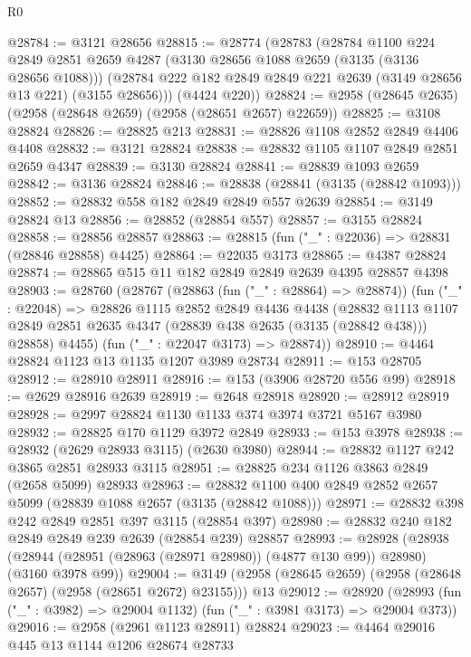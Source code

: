 \begin{lexlean}{R0}
\begin{coremodule}
@28784 := @3121 @28656
@28815 := @28774
    (@28783
      (@28784
        @1100
        @224
        @2849
        @2851
        @2659
        @4287
        (@3130 @28656 @1088 @2659 (@3135 (@3136 @28656 @1088)))
        (@28784 @222 @182 @2849 @2849 @221 @2639 (@3149 @28656 @13 @221) (@3155 @28656)))
      (@4424 @220))
@28824 := @2958 (@28645 @2635) (@2958 (@28648 @2659) (@2958 (@28651 @2657) @22659))
@28825 := @3108 @28824
@28826 := @28825 @213
@28831 := @28826 @1108 @2852 @2849 @4406 @4408
@28832 := @3121 @28824
@28838 := @28832 @1105 @1107 @2849 @2851 @2659 @4347
@28839 := @3130 @28824
@28841 := @28839 @1093 @2659
@28842 := @3136 @28824
@28846 := @28838 (@28841 (@3135 (@28842 @1093)))
@28852 := @28832 @558 @182 @2849 @2849 @557 @2639
@28854 := @3149 @28824 @13
@28856 := @28852 (@28854 @557)
@28857 := @3155 @28824
@28858 := @28856 @28857
@28863 := @28815 (fun ("_" : @22036) => @28831 (@28846 @28858) @4425)
@28864 := @22035 @3173
@28865 := @4387 @28824
@28874 := @28865 @515 @11 @182 @2849 @2849 @2639 @4395 @28857 @4398
@28903 := @28760
    (@28767
      (@28863 (fun ("_" : @28864) => @28874))
      (fun ("_" : @22048) =>
      @28826
        @1115
        @2852
        @2849
        @4436
        @4438
        (@28832
          @1113
          @1107
          @2849
          @2851
          @2635
          @4347
          (@28839 @438 @2635 (@3135 (@28842 @438)))
          @28858)
        @4455)
      (fun ("_" : @22047 @3173) => @28874))
@28910 := @4464 @28824 @1123 @13 @1135 @1207 @3989 @28734
@28911 := @153 @28705
@28912 := @28910 @28911
@28916 := @153 (@3906 @28720 @556 @99)
@28918 := @2629 @28916 @2639
@28919 := @2648 @28918
@28920 := @28912 @28919
@28928 := @2997 @28824 @1130 @1133 @374 @3974 @3721 @5167 @3980
@28932 := @28825 @170 @1129 @3972 @2849
@28933 := @153 @3978
@28938 := @28932 (@2629 @28933 @3115) (@2630 @3980)
@28944 := @28832 @1127 @242 @3865 @2851 @28933 @3115
@28951 := @28825 @234 @1126 @3863 @2849 (@2658 @5099) @28933
@28963 := @28832 @1100 @400 @2849 @2852 @2657 @5099 (@28839 @1088 @2657 (@3135 (@28842 @1088)))
@28971 := @28832 @398 @242 @2849 @2851 @397 @3115 (@28854 @397)
@28980 := @28832 @240 @182 @2849 @2849 @239 @2639 (@28854 @239) @28857
@28993 := @28928
    (@28938 (@28944 (@28951 (@28963 (@28971 @28980)) (@4877 @130 @99)) @28980) (@3160 @3978 @99))
@29004 := @3149 (@2958 (@28645 @2659) (@2958 (@28648 @2657) (@2958 (@28651 @2672) @23155))) @13
@29012 := @28920
    (@28993 (fun ("_" : @3982) => @29004 @1132) (fun ("_" : @3981 @3173) => @29004 @373))
@29016 := @2958 (@2961 @1123 @28911) @28824
@29023 := @4464 @29016 @445 @13 @1144 @1206 @28674 @28733

\end{coremodule}
\end{lexlean}
